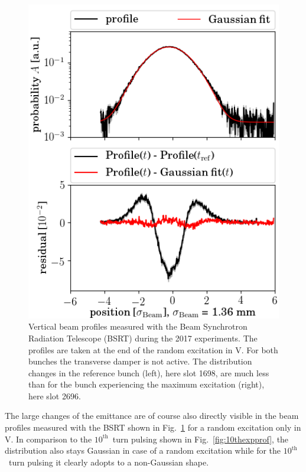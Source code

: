 \documentclass[%
 reprint,
 amsmath,amssymb,
 aps,
prstab,
]{revtex4-1}
\begin{document}
\begin{figure}[h]
\begin{minipage}[t]{0.49\linewidth}
		\includegraphics[width=1.0\linewidth]{profile_v_ranv_slot_1532.png}
	\end{minipage}
	\caption{\label{fig:ranexpprof}Vertical beam profiles measured with the Beam Synchrotron Radiation Telescope (BSRT) during the 2017 experiments. The profiles are taken at the end of the random excitation in V. For both bunches the transverse damper is not active. The distribution changes in the reference bunch (left), here slot 1698, are much less than for the bunch experiencing the maximum excitation (right), here slot 2696.}
\end{figure}
The large changes of the emittance are of course also directly visible in the beam profiles measured with the BSRT shown in Fig.~\ref{fig:ranexpprof} for a random excitation only in V. In comparison to the $10^{\mathrm{th}}$~turn pulsing shown in Fig.~\ref{fig:10thexpprof}, the distribution also stays Gaussian in case of a random excitation while for the $10^{\mathrm{th}}$~turn pulsing it clearly adopts to a non-Gaussian shape.
\end{document}
